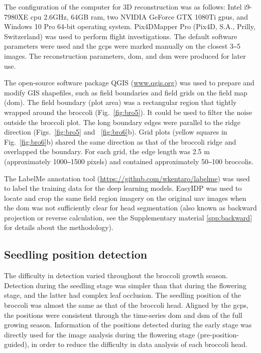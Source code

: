 The configuration of the computer for 3D reconstruction was as follows: Intel  i9-7980XE \gls{cpu} \@2.6GHz, 64GB \gls{ram}, two NVIDIA GeForce GTX 1080Ti \gls{gpu}s, and Windows 10 Pro 64-bit operating system. Pix4DMapper Pro (Pix4D, S.A., Prilly, Switzerland) was used to perform flight investigations. The default software parameters were used and the \gls{gcp}s were marked manually on the closest 3‒5 images. The reconstruction parameters, \gls{dom}, and \gls{dsm} were produced for later use. 

The open-source software package QGIS (\url{www.qgis.org}) was used to prepare and modify GIS shapefiles, such as field boundaries and field grids on the field map (\gls{dom}). The field boundary (plot area) was a rectangular region that tightly wrapped around the broccoli (Fig.~\ref{fig:bro5}). It could be used to filter the noise outside the broccoli plot. The long boundary edges were parallel to the ridge direction (Figs.~\ref{fig:bro5} and ~\ref{fig:bro6}b). Grid plots (yellow squares in Fig.~\ref{fig:bro6}b) shared the same direction as that of the broccoli ridge and overlapped the boundary. For each grid, the edge length was 2.5 m (approximately 1000‒1500 pixels) and contained approximately 50‒100 broccolis. 



The LabelMe annotation tool (\url{https://github.com/wkentaro/labelme}) was used to label the training data for the deep learning models. EasyIDP \citep[\url{https://github.com/UTokyo-FieldPhenomics-Lab/EasyIDP}]{wang_easyidp_2021} was used to locate and crop the same field region imagery on the original \gls{uav} images when the \gls{dom} was not sufficiently clear for head segmentation (also known as backward projection or reverse calculation, see the Supplementary material \ref{spp:backward} for details about the methodology).

\subsection{Seedling position detection} \label{sec:detect}

The difficulty in detection varied throughout the broccoli growth season. Detection during the seedling stage was simpler than that during the flowering stage, and the latter had complex leaf occlusion. The seedling position of the broccoli was almost the same as that of the broccoli head. Aligned by the \gls{gcp}s, the positions were consistent through the time-series \gls{dom} and \gls{dsm} of the full growing season. Information of the positions detected during the early stage was directly used for the image analysis during the flowering stage (pre-position-guided), in order to reduce the difficulty in data analysis of each broccoli head.

